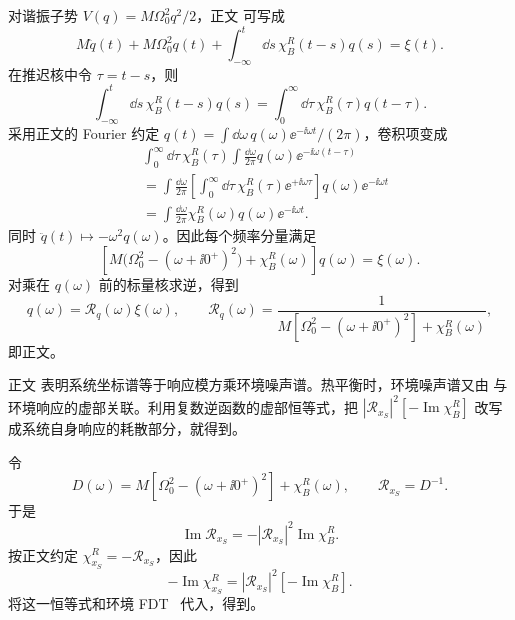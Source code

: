 \begin{derivation}
对谐振子势 $V(q)=M\Omega_0^2q^2/2$，正文 可写成
\[
M\ddot q(t)+M\Omega_0^2q(t)
+\int_{-\infty}^{t}\dd s\,\chi_B^R(t-s)q(s)
=\xi(t).
\]
在推迟核中令 $\tau=t-s$，则
\[
\int_{-\infty}^{t}\dd s\,\chi_B^R(t-s)q(s)
=\int_0^\infty\dd\tau\,\chi_B^R(\tau)q(t-\tau).
\]
采用正文的 Fourier 约定
$q(t)=\int \dd\omega\,q(\omega)\ee^{-\ii\omega t}/(2\pi)$，卷积项变成
\begin{align*}
&\int_0^\infty\dd\tau\,\chi_B^R(\tau)
\int\frac{\dd\omega}{2\pi}q(\omega)
\ee^{-\ii\omega(t-\tau)}\\
&=\int\frac{\dd\omega}{2\pi}
\left[
\int_0^\infty\dd\tau\,
\chi_B^R(\tau)\ee^{+\ii\omega\tau}
\right]q(\omega)\ee^{-\ii\omega t}\\
&=\int\frac{\dd\omega}{2\pi}
\chi_B^R(\omega)q(\omega)\ee^{-\ii\omega t}.
\end{align*}
同时 $\ddot q(t)\mapsto-\omega^2q(\omega)$。因此每个频率分量满足
\[
\left[
M\bigl(\Omega_0^2-(\omega+\ii0^+)^2\bigr)
+\chi_B^R(\omega)
\right]q(\omega)=\xi(\omega).
\]
对乘在 $q(\omega)$ 前的标量核求逆，得到
\[
q(\omega)=\mathcal R_q(\omega)\xi(\omega),
\qquad
\mathcal R_q(\omega)
=\frac{1}{M[\Omega_0^2-(\omega+\ii0^+)^2]+\chi_B^R(\omega)},
\]
即正文。
\end{derivation}

\begin{derivation}

正文 表明系统坐标谱等于响应模方乘环境噪声谱。热平衡时，环境噪声谱又由 与环境响应的虚部关联。利用复数逆函数的虚部恒等式，把 $|\mathcal R_{x_S}|^2[-\operatorname{Im}\chi_B^R]$ 改写成系统自身响应的耗散部分，就得到。

令
\[
D(\omega)=M[\Omega_0^2-(\omega+\ii0^+)^2]+\chi_B^R(\omega),
\qquad
\mathcal R_{x_S}=D^{-1}.
\]
于是
\[
\operatorname{Im}\mathcal R_{x_S}
=-|\mathcal R_{x_S}|^2\operatorname{Im}\chi_B^R.
\]
按正文约定 $\chi_{x_S}^R=-\mathcal R_{x_S}$，因此
\[
-\operatorname{Im}\chi_{x_S}^R
=|\mathcal R_{x_S}|^2[-\operatorname{Im}\chi_B^R].
\]
将这一恒等式和环境 FDT~ 代入，得到。
\end{derivation}
